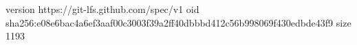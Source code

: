 version https://git-lfs.github.com/spec/v1
oid sha256:e08e6bac4a6ef3aaf00c3003f39a2ff40dbbbd412c56b998069f430edbde43f9
size 1193
